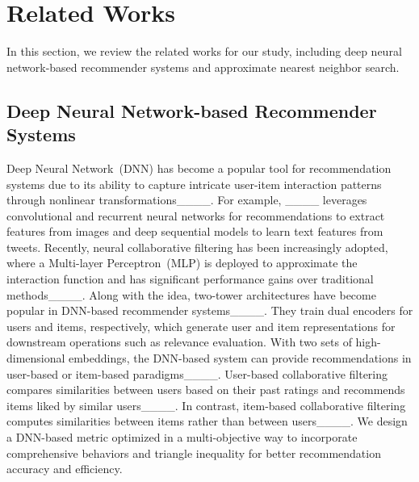 \section{Related Works}
\label{sec:related_work}

In this section, we review the related works for our study, including deep neural network-based recommender systems and approximate nearest neighbor search.

\subsection{Deep Neural Network-based Recommender Systems}
Deep Neural Network~(DNN) has become a popular tool for recommendation systems due to its ability to capture intricate user-item interaction patterns through nonlinear transformations____.
For example, ____ leverages convolutional and recurrent neural networks for recommendations to extract features from images and deep sequential models to learn text features from tweets.
Recently, neural collaborative filtering has been increasingly adopted, where a Multi-layer Perceptron~(MLP) is deployed to approximate the interaction function and has significant performance gains over traditional methods____.
Along with the idea, two-tower architectures have become popular in DNN-based recommender systems____. They train dual encoders for users and items, respectively, which generate user and item representations for downstream operations such as relevance evaluation.
With two sets of high-dimensional embeddings, the DNN-based system can provide recommendations in user-based or item-based paradigms____.
User-based collaborative filtering compares similarities between users based on their past ratings and recommends items liked by similar users____.
In contrast, item-based collaborative filtering computes similarities between items rather than between users____.
We design a DNN-based metric optimized in a multi-objective way to incorporate comprehensive behaviors and triangle inequality for better recommendation accuracy and efficiency.


